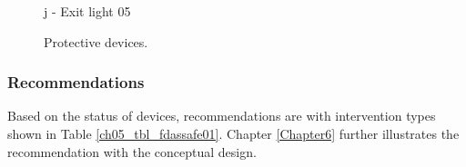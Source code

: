 \begin{figure}[!htb]
\begin{minipage}[b]{0.22\linewidth}
	\caption*{j - Exit light 05}
\end{minipage}
	\caption{Protective devices.}
	\label{ch05_fig_fdassafety01}
\end{figure}

\subsubsection{Recommendations}
Based on the status of devices, recommendations are with intervention types shown in Table \ref{ch05_tbl_fdassafe01}. Chapter \ref{Chapter6} further illustrates the recommendation with the conceptual design.





